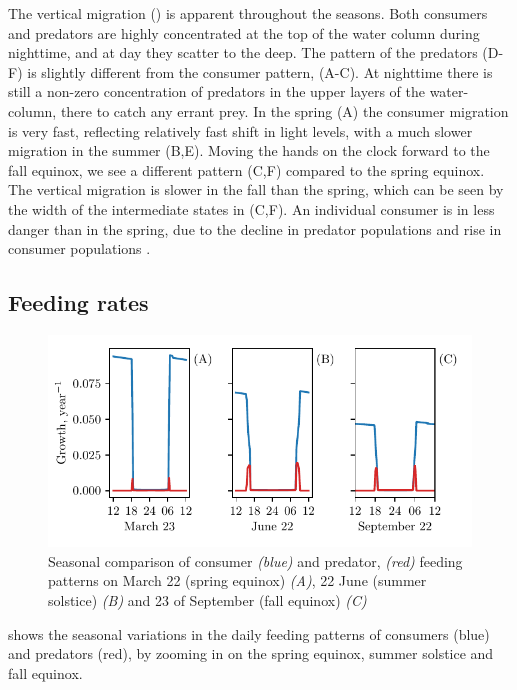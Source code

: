The vertical migration () is apparent throughout the seasons. Both consumers and predators are highly concentrated at the top of the water column during nighttime, and at day they scatter to the deep. The pattern of the predators (D-F) is slightly different from the consumer pattern,  (A-C). At nighttime there is still a non-zero concentration of predators in the upper layers of the water-column, there to catch any errant prey. In the spring (A) the consumer migration is very fast, reflecting relatively fast shift in light levels, with a much slower migration in the summer (B,E). Moving the hands on the clock forward to the fall equinox, we see a different pattern (C,F) compared to the spring equinox. The vertical migration is slower in the fall than the spring, which can be seen by the width of the intermediate states in (C,F). An individual consumer is in less danger than in the spring, due to the decline in predator populations and rise in consumer populations .

\subsection*{Feeding rates}
\begin{figure}[H]
\includegraphics{plots/growth_short_rational.pdf}
\caption{Seasonal comparison of consumer \emph{(blue)} and predator, \emph{(red)} feeding patterns on March 22 (spring equinox) \emph{(A)}, 22 June (summer solstice) \emph{(B)} and 23 of September (fall equinox) \emph{(C)}}
\label{fig:growth_short_rational}
\end{figure}
 shows the seasonal variations in the daily feeding patterns of consumers (blue) and predators (red), by zooming in on the spring equinox, summer solstice and fall equinox.

